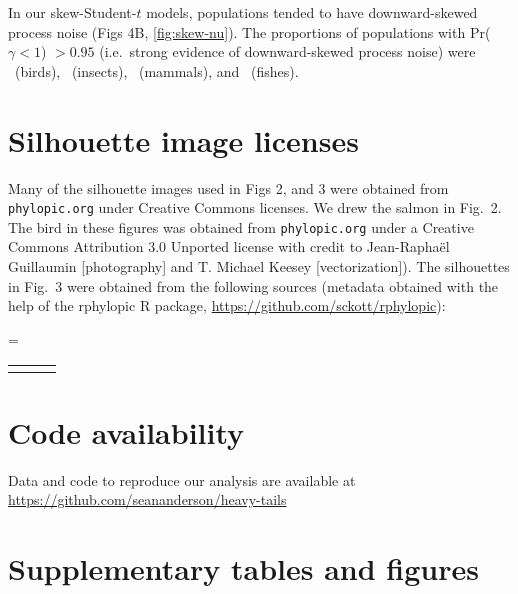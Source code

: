 \documentclass[12pt]{article}
\begin{document}
In our skew-Student-$t$ models, populations tended to have downward-skewed
process noise (Figs 4B, \ref{fig:skew-nu}). The proportions of populations with
Pr($\gamma < 1$) $> 0.95$
(i.e.\ strong evidence of downward-skewed process noise)
were
\propSkewedAves\ (birds), \propSkewedInsecta\ (insects),
\propSkewedMammalia\ (mammals), and \propSkewedOsteichthyes\ (fishes).

\section{Silhouette image licenses}

Many of the silhouette images used in Figs 2, and 3 were obtained from
\texttt{phylopic.org} under Creative Commons licenses. We drew the
salmon in Fig.~2. The bird in these figures was obtained
from \texttt{phylopic.org} under a Creative Commons Attribution 3.0 Unported
license with credit to Jean-Raphaël Guillaumin {[}photography{]} and T.
Michael Keesey {[}vectorization{]}). The silhouettes in
Fig.~3 were obtained from the following sources (metadata
obtained with the help of the rphylopic R package,
\url{https://github.com/sckott/rphylopic}):

\clearpage

\LTcapwidth=\textwidth
\singlespacing
\begin{footnotesize}
\begin{longtable}{>{\RaggedRight}m{3.2cm}>{\RaggedRight}p{6.5cm}>{\RaggedRight}p{5.0cm}}
\toprule

\label{tab:phylopic}
\end{longtable}
\end{footnotesize}
\onehalfspacing

\section{Code availability} Data and code to reproduce our analysis are
available at\\ \url{https://github.com/seananderson/heavy-tails}

%



\clearpage

\section{Supplementary tables and figures}
\end{document}
